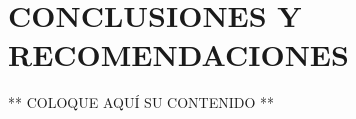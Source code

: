 \chapter*{CONCLUSIONES Y RECOMENDACIONES}
\thispagestyle{empty}

\renewcommand{\thefigure}{C.\arabic{figure}}
\setcounter{figure}{0}

** COLOQUE AQUÍ SU CONTENIDO **
